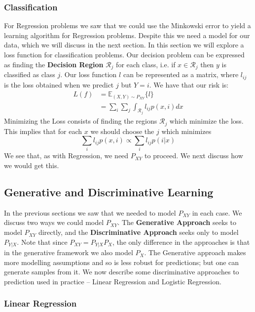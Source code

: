 \documentclass[]{article}
\theoremstyle{mattstyle}
\theoremstyle{definition}
\begin{document}
\subsubsection{Classification}

For Regression problems we saw that we could use the Minkowski error to yield a learning algorithm for Regression problems. Despite this we need a model for our data, which we will discuss in the next section. In this section we will explore a loss function for classification problems. Our decision problem can be expressed as finding the \textbf{Decision Region} $\mathcal{R}_j$ for each class, i.e. if $x \in \mathcal{R}_j$ then $y$ is classified as class $j$.
Our loss function $l$ can be represented as a matrix, where $l_{ij}$ is the loss obtained when we predict $j$ but $Y=i$. We have that our risk is:
\begin{align*}
L(f) &= \mathbb{E}_{(X,Y)\sim P_{XY}}\{l\}\\
&= \sum_i \sum_j \int_{\mathcal{R}_j} l_{ij} p(x, i) dx
\end{align*}
Minimizing the Loss consists of finding the regions $\mathcal{R}_j$ which minimize the loss. This implies that for each $x$ we should choose the $j$ which minimizes 
$$\sum_i l_{ij} p(x, i)\propto \sum_i l_{ij} p(i|x)$$
We see that, as with Regression, we need $P_{XY}$ to proceed. We next discuss how we would get this.

\subsection{Generative and Discriminative Learning}

In the previous sections we saw that we needed to model $P_{XY}$ in each case. We discuss two ways we could model $P_{XY}$. The \textbf{Generative Approach} seeks to model $P_{XY}$ directly, and the \textbf{Discriminative Approach} seeks only to model $P_{Y|X}$. Note that since $P_{XY}=P_{Y|X}P_{X}$, the only difference in the approaches is that in the generative framework we also model $P_{X}$. The Generative approach makes more modelling assumptions and so is less robust for predictions; but one can generate samples from it. We now describe some discriminative approaches to prediction used in practice -- Linear Regression and Logistic Regression.

\newpage

\subsubsection{Linear Regression}
\end{document}
